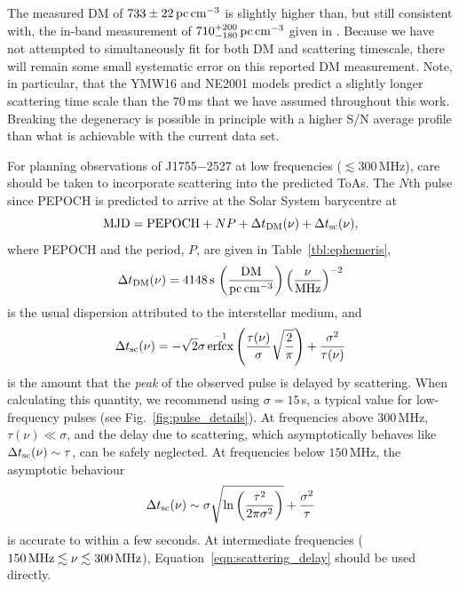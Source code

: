 \documentclass[fleqn,usenatbib]{mnras}
\newcommand{\src}{J1755$-$2527}
\DeclareMathOperator{\erfcx}{erfcx}
\newcommand{\Fig}{Fig.}
\newcommand{\Tab}{Table}
\newcommand{\Eqn}{Equation}
\begin{document}
The measured DM of $733 \pm 22\,{\rm pc}\,{\rm cm}^{-3}$ is slightly higher than, but still consistent with, the in-band measurement of $710^{+200}_{-180}\,{\rm pc}\,{\rm cm}^{-3}$ given in .
Because we have not attempted to simultaneously fit for both DM and scattering timescale, there will remain some small systematic error on this reported DM measurement.
Note, in particular, that the YMW16 and NE2001 models predict a slightly longer scattering time scale than the $70\,$ms that we have assumed throughout this work.
Breaking the degeneracy is possible in principle with a higher S/N average profile than what is achievable with the current data set.

For planning observations of \src{} at low frequencies ($\lesssim 300$\,MHz), care should be taken to incorporate scattering into the predicted ToAs.
The $N$th pulse since PEPOCH is predicted to arrive at the Solar System barycentre at
\begin{equation}
    {\rm MJD} = {\rm PEPOCH} + NP + \Delta t_{\rm DM}(\nu) + \Delta t_{\rm sc}(\nu),
    \label{eqn:timing}
\end{equation}
where PEPOCH and the period, $P$, are given in \Tab~\ref{tbl:ephemeris},
\begin{equation}
    \Delta t_{\rm DM}(\nu) = 4148\,{\rm s} \, \left(\frac{\rm DM}{{\rm pc\,cm}^{-3}}\right) \left(\frac{\nu}{\rm MHz}\right)^{-2}
\end{equation}
is the usual dispersion attributed to the interstellar medium, and
\begin{equation}
    \Delta t_{\rm sc}(\nu) = -\sqrt{2}\sigma\erfcx^{-1}\left(\frac{\tau(\nu)}{\sigma}\sqrt{\frac{2}{\pi}}\right) + \frac{\sigma^2}{\tau(\nu)}
    \label{eqn:scattering_delay}
\end{equation}
is the amount that the \emph{peak} of the observed pulse is delayed by scattering.
When calculating this quantity, we recommend using $\sigma = 15\,$s, a typical value for low-frequency pulses (see \Fig~\ref{fig:pulse_details}).
At frequencies above $300\,$MHz, $\tau(\nu) \ll \sigma$, and the delay due to scattering, which asymptotically behaves like $\Delta t_{\rm sc}(\nu) \sim \tau$, can be safely neglected.
At frequencies below $150\,$MHz, the asymptotic behaviour
\begin{equation}
    \Delta t_{\rm sc}(\nu) \sim \sigma \sqrt{\ln \left(\frac{\tau^2}{2\pi \sigma^2}\right)} + \frac{\sigma^2}{\tau}
\end{equation}
is accurate to within a few seconds.
At intermediate frequencies ($150\,{\rm MHz} \lesssim \nu \lesssim 300\,{\rm MHz}$), \Eqn~\ref{eqn:scattering_delay} should be used directly.
\end{document}
